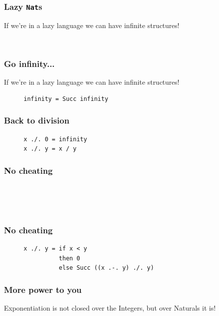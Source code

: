 \documentclass{beamer}
\begin{document}
  \begin{frame}[fragile]
    \frametitle{Lazy \texttt{Nat}s}
    If we're in a lazy language we can have infinite structures!
    \begin{figure}
    {\color{dark-gray}
      \centering
\begin{BVerbatim}
 
\end{BVerbatim}
    }
    \end{figure}
  \end{frame}
  \begin{frame}[fragile]
    \frametitle{Go infinity...}
    If we're in a lazy language we can have infinite structures!
    \begin{figure}
    {\color{dark-gray}
      \centering
\begin{BVerbatim}
infinity = Succ infinity
\end{BVerbatim}
    }
    \end{figure}
  \end{frame}
  \begin{frame}[fragile]
    \frametitle{Back to division}
    \begin{figure}
    {\color{dark-gray}
      \centering
\begin{BVerbatim}
x ./. 0 = infinity
x ./. y = x / y
\end{BVerbatim}
    }
    \end{figure}
  \end{frame}
  \begin{frame}[fragile]
    \frametitle{No cheating}
    \begin{figure}
    {\color{dark-gray}
      \centering
\begin{BVerbatim}
                  
                
                                     
\end{BVerbatim}
    }
    \end{figure}
  \end{frame}
  \begin{frame}[fragile]
    \frametitle{No cheating}
    \begin{figure}
    {\color{dark-gray}
      \centering
\begin{BVerbatim}
x ./. y = if x < y
          then 0
          else Succ ((x .-. y) ./. y)
\end{BVerbatim}
    }
    \end{figure}
  \end{frame}
  \begin{frame}[fragile]
    \frametitle{More power to you}
    Exponentiation is not closed over the Integers, but over Naturals it is!
    \begin{figure}
    {\color{dark-gray}
      \centering
\begin{BVerbatim}
                  
                            
\end{BVerbatim}
    }
    \end{figure}
  \end{frame}
\end{document}
